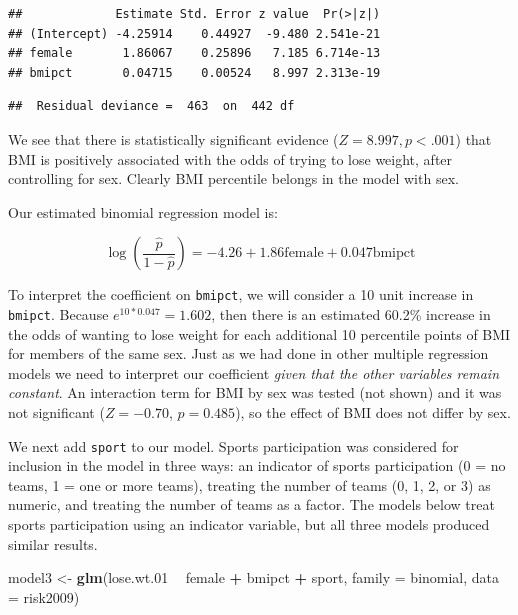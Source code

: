 \documentclass[
]{krantz}
\newenvironment{Shaded}{\begin{snugshade}}{\end{snugshade}}
\newcommand{\DataTypeTok}[1]{\textcolor[rgb]{0.27,0.27,0.27}{#1}}
\newcommand{\FloatTok}[1]{\textcolor[rgb]{0.06,0.06,0.06}{#1}}
\newcommand{\KeywordTok}[1]{\textcolor[rgb]{0.27,0.27,0.27}{\textbf{#1}}}
\newcommand{\NormalTok}[1]{#1}
\newcommand{\OperatorTok}[1]{\textcolor[rgb]{0.43,0.43,0.43}{\textbf{#1}}}
\newcommand{\StringTok}[1]{\textcolor[rgb]{0.5,0.5,0.5}{#1}}
\begin{document}
\begin{verbatim}
##             Estimate Std. Error z value  Pr(>|z|)
## (Intercept) -4.25914    0.44927  -9.480 2.541e-21
## female       1.86067    0.25896   7.185 6.714e-13
## bmipct       0.04715    0.00524   8.997 2.313e-19
\end{verbatim}

\begin{verbatim}
##  Residual deviance =  463  on  442 df
\end{verbatim}

We see that there is statistically significant evidence (\(Z=8.997, p<.001\)) that BMI is positively associated with the odds of trying to lose weight, after controlling for sex. Clearly BMI percentile belongs in the model with sex.

Our estimated binomial regression model is:

\[\log\left(\frac{\hat{p}}{1-\hat{p}}\right)= -4.26+1.86\textrm{female}+0.047\textrm{bmipct}\]

To interpret the coefficient on \texttt{bmipct}, we will consider a 10 unit increase in \texttt{bmipct}. Because \(e^{10*0.047}=1.602\), then there is an estimated 60.2\% increase in the odds of wanting to lose weight for each additional 10 percentile points of BMI for members of the same sex. Just as we had done in other multiple regression models we need to interpret our coefficient \emph{given that the other variables remain constant}. An interaction term for BMI by sex was tested (not shown) and it was not significant (\(Z=-0.70\), \(p=0.485\)), so the effect of BMI does not differ by sex.

We next add \texttt{sport} to our model. Sports participation was considered for inclusion in the model in three ways: an indicator of sports participation (0 = no teams, 1 = one or more teams), treating the number of teams (0, 1, 2, or 3) as numeric, and treating the number of teams as a factor. The models below treat sports participation using an indicator variable, but all three models produced similar results.

\begin{Shaded}
\begin{Highlighting}[]
\NormalTok{model3 <-}\StringTok{ }\KeywordTok{glm}\NormalTok{(lose.wt}\FloatTok{.01} \OperatorTok{~}\StringTok{ }\NormalTok{female }\OperatorTok{+}\StringTok{ }\NormalTok{bmipct }\OperatorTok{+}\StringTok{ }\NormalTok{sport, }
              \DataTypeTok{family =}\NormalTok{ binomial, }\DataTypeTok{data =}\NormalTok{ risk2009)}
\end{Highlighting}
\end{Shaded}
\end{document}

